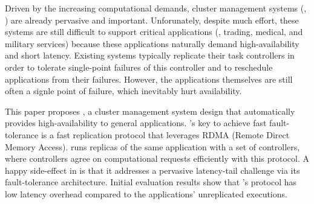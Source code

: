 
Driven by the increasing computational demands, cluster management systems 
(\eg, \mesos) are already pervasive and important. Unforunately, despite much 
effort, these systems are still difficult to support critical applications 
(\eg, trading, medical, and military services) because these applications 
naturally demand high-availability and short latency. Existing systems 
typically replicate their task controllers in order to tolerate single-point 
failures of this controller and to reschedule applications from their failures. 
However, the applications themselves are still often a signle point of failure, 
which inevitably hurt availability.


This paper proposes \xxx, a cluster management system design that automatically 
provides high-availability to general applications. \xxx's key to achieve fast 
fault-tolerance is a fast \paxos replication protocol that leverages RDMA 
(Remote Direct Memory Access). \xxx runs replicas of the same application with 
a set of controllers, where controllers agree on computational requests 
efficiently with this protocol. A happy side-effect in \xxx is that it 
addresses a pervasive latency-tail challenge via its fault-tolerance 
architecture. Initial evaluation results show that \xxx's protocol has low 
latency overhead compared to the applications' unreplicated executions.


